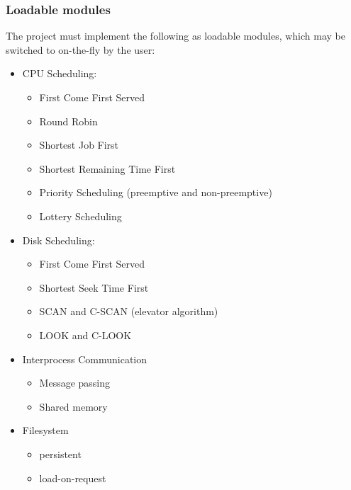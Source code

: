 \documentclass[10pt,a4paper]{article}
\begin{document}
\subsubsection*{Loadable modules}
The project must implement the following as loadable modules, which may be
switched to on-the-fly by the user:
\begin{itemize}
    \item CPU Scheduling:
        \begin{itemize}
            \item First Come First Served
            \item Round Robin
            \item Shortest Job First
            \item Shortest Remaining Time First
            \item Priority Scheduling (preemptive and non-preemptive)
            \item Lottery Scheduling
        \end{itemize}
    \item Disk Scheduling:
        \begin{itemize}
            \item First Come First Served
            \item Shortest Seek Time First
            \item SCAN and C-SCAN (elevator algorithm)
            \item LOOK and C-LOOK
        \end{itemize}
    \item Interprocess Communication
        \begin{itemize}
            \item Message passing
            \item Shared memory
        \end{itemize}
    \item Filesystem
        \begin{itemize}
            \item persistent
            \item load-on-request
        \end{itemize}
\end{itemize}
\end{document}
